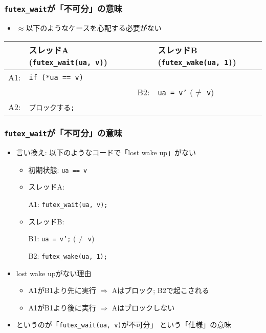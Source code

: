 \documentclass[12pt,dvipdfmx]{beamer}
\begin{document}
\begin{frame}
  \frametitle{{\tt futex\_wait}が「不可分」の意味}
  \begin{itemize}
  \item $\approx$以下のようなケースを心配する必要がない
  \end{itemize}
  \begin{center}
  {\scriptsize
\begin{tabular}{|rl|rl|}
        & スレッドA ({\tt futex\_wait(ua, v)})
  &     & スレッドB ({\tt futex\_wake(ua, 1)})         \\\hline
A1: & {\tt if (*ua == v)} &     &                   \\
    &                     & B2: & {\tt *ua = v'} ($\neq$ {\tt v})  \\
A2: & {\tt ブロックする;} &     & \\
\end{tabular}}
\end{center}
\end{frame}


\begin{frame}
  \frametitle{{\tt futex\_wait}が「不可分」の意味}
  \begin{itemize}
  \item 言い換え: 以下のようなコードで「lost wake up」がない
    \begin{itemize}
    \item 初期状態: {\tt *ua == v}
    \item スレッドA:

      A1: {\tt futex\_wait(ua, v);}
    \item スレッドB:

      B1: {\tt *ua = v';} ($\neq$ {\tt v}) 

      B2: {\tt futex\_wake(ua, 1);}
    \end{itemize}
  \item lost wake upがない理由
    \begin{itemize}
    \item A1がB1より先に実行 $\Rightarrow$ Aはブロック; B2で起こされる
    \item A1がB1より後に実行 $\Rightarrow$ Aはブロックしない
    \end{itemize}
  \item {}
    というのが「{\tt futex\_wait(ua, v)}が不可分」
    という「仕様」の意味
  \end{itemize}
\end{frame}
\end{document}

